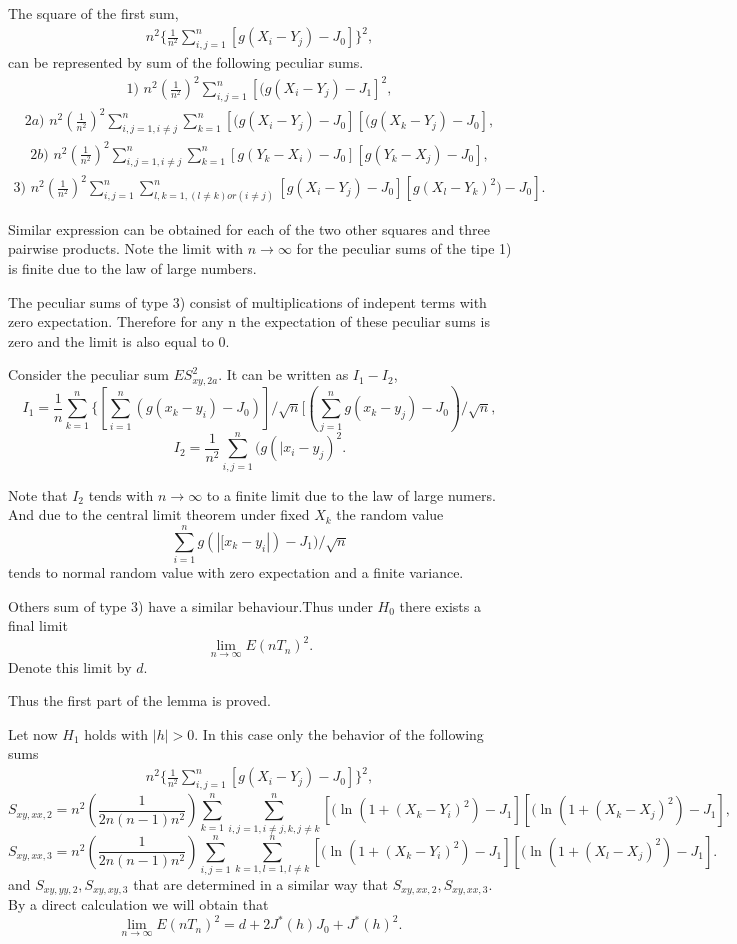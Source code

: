 \documentclass[final,11pt,3p]{elsarticle}
\begin{document}
The square of the first sum, 
\begin{eqnarray*}
n^2 \{\frac{1}{n^2}\sum_{i,j=1}^n [g(X_i - Y_j)-J_0]\}^2,
\end{eqnarray*}
can be represented by sum of the following peculiar sums.
\begin{eqnarray*}
1)\,\,n^2 (\frac{1}{n^2})^2 \sum_{i,j=1}^n [(g(X_i - Y_j) -J_1]^2, 
\end{eqnarray*}
\begin{eqnarray*}
2a)\,\,n^2(\frac{1}{n^2})^2 \sum_{i,j=1,i \ne j}^n\sum_{k=1}^n [(g(X_i - Y_j)-J_0][(g(X_k - Y_j)-J_0], 
\end{eqnarray*}
\begin{eqnarray*}
2b)\,\,n^2(\frac{1}{n^2})^2 \sum_{i,j=1,i \ne j}^n\sum_{k=1}^n [g(Y_k - X_i)-J_0][g (Y_k - X_j)-J_0], 
\end{eqnarray*}
\begin{eqnarray*}
3)\,\, n^2 (\frac{1}{n^2})^2 \sum_{i,j=1}^n\sum_{{l,k=1}, (l \ne  k)or(i\ne j)}^n  [g (X_i - Y_j)-J_0][g(X_l - Y_k)^2)-J_0]. 
\end{eqnarray*}

Similar expression can be obtained for each of the two other squares and three  pairwise
products. 
Note the limit with $n \to \infty$ for the peculiar sums of the tipe 1) is finite due to the law of large numbers.

The peculiar sums of type 3) consist of multiplications of indepent terms with zero expectation. Therefore for any n the expectation of these peculiar sums is zero and the limit is also equal to 0.

Consider the peculiar sum $ES^2_{xy,2a}.$  It can be written as $I_1 - I_2$, 
$$
I_1=\frac{1}{n}\sum_{k=1}^n \{[\sum_{i=1}^n 
(g(x_k-y_i)-J_0)]/\sqrt{n}[(\sum_{j=1}^n 
g(x_k-y_j)-J_0)/\sqrt{n},
$$
$$
I_2= \frac {1}{n^2}\sum_{i,j=1}^n(g(|x_i-y_j)^2.
$$

Note that $I_2$ tends with $n \to \infty$ to a finite limit due to the law of large numers. And
due to the central limit theorem
under fixed  $X_k$ the random value
$$
\sum_{i=1}^n 
g(|[x_k-y_i|)-J_1)/\sqrt{n}
$$
tends to normal random value with zero expectation and a finite variance.

Others sum of type 3) have a similar behaviour.Thus under $H_0$  there exists a final limit
$$
\lim_{n \to \infty}E(nT_n)^2.
$$
Denote this limit by $d$.

Thus the first part of the lemma is proved.

Let now $H_1$ holds with 
$|h|>0$. In this case only the behavior of the following sums
\begin{eqnarray*}
n^2 \{\frac{1}{n^2}\sum_{i,j=1}^n [g(X_i - Y_j)-J_0]\}^2,
\end{eqnarray*}
$$
S_{xy,xx,2}=n^2 (\frac{1}{2n(n-1)n^2})\sum_{k=1}^n \sum_{i,j=1, i\ne j,k, j\ne k}^n[(\ln(1 + (X_k - Y_i)^2)-J_1][(\ln(1 + (X_k - X_j)^2)-J_1], 
$$
$$
S_{xy,xx,3}=n^2 (\frac{1}{2n(n-1)n^2})\sum_{i,j=1}^n\sum_{k=1,l=1,l \ne k}^n [(\ln(1 + (X_k - Y_i)^2)-J_1][(\ln(1 + (X_l - X_j)^2)-J_1].
$$
and $S_{xy,yy,2},S_{xy,xy,3}$ that are determined in a similar way that  $S_{xy,xx,2},S_{xy,xx,3}$.
By a direct calculation we will obtain that
$$
\lim_{n \to \infty}E(nT_n)^2=
d + 2J^*(h)J_0 + J^*(h)^2.
$$
\end{document}
